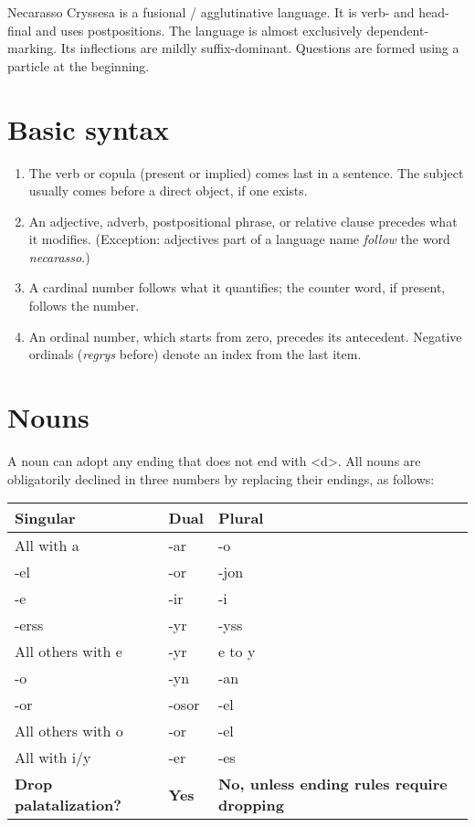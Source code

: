 \documentclass{book}
\begin{document}
Necarasso Cryssesa is a fusional / agglutinative language. It is verb- and head-final and uses postpositions. The language is almost exclusively dependent-marking. Its inflections are mildly suffix-dominant. Questions are formed using a particle at the beginning.

\section{Basic syntax}

\begin{enumerate}
  \item The verb or copula (present or implied) comes last in a sentence. The subject usually comes before a direct object, if one exists.
  \item An adjective, adverb, postpositional phrase, or relative clause precedes what it modifies. (Exception: adjectives part of a language name \emph{follow} the word \emph{necarasso}.)
  \item A cardinal number follows what it quantifies; the counter word, if present, follows the number.
  \item An ordinal number, which starts from zero, precedes its antecedent. Negative ordinals (\emph{regrys} before) denote an index from the last item.
\end{enumerate}

\section{Nouns}

A noun can adopt any ending that does not end with <d>. All nouns are obligatorily declined in three numbers by replacing their endings, as follows:

\begin{center}
  \begin{tabular}{|p{4cm}|p{4cm}|p{4cm}|}
    \hline
    \textbf{Singular} & \textbf{Dual} & \textbf{Plural} \\ \hline
    All with a & -ar & -o \\ \hline
    -el & -or & -jon \\
    -e & -ir & -i \\
    -erss & -yr & -yss \\
    All others with e & -yr & e to y \\ \hline
    -o & -yn & -an \\
    -or & -osor & -el \\
    All others with o & -or & -el \\ \hline
    All with i/y & -er & -es \\ \hline
    \textbf{Drop palatalization?} & \textbf{Yes} & \textbf{No, unless ending rules require dropping} \\ \hline
  \end{tabular}
\end{center}
\end{document}
